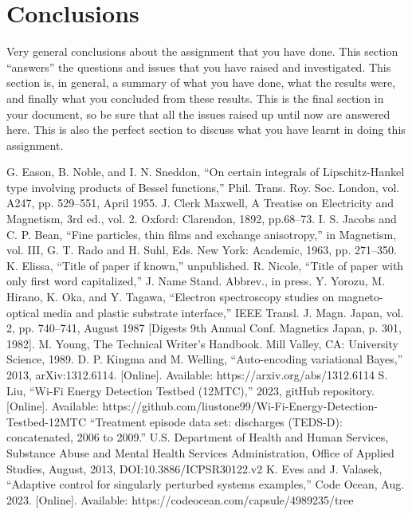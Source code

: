 \documentclass[conference]{IEEEtran}
\begin{document}
\section{Conclusions}
Very general conclusions about the assignment that you have done. This section “answers” the questions and issues that you have raised and investigated. This section is, in general, a summary of what you have done, what the results were, and finally what you concluded from these results. This is the final section in your document, so be sure that all the issues raised up until now are answered here. This is also the perfect section to discuss what you have learnt in doing this assignment.


\begin{thebibliography}{00}
 G. Eason, B. Noble, and I. N. Sneddon, ``On certain integrals of Lipschitz-Hankel type involving products of Bessel functions,'' Phil. Trans. Roy. Soc. London, vol. A247, pp. 529--551, April 1955.
 J. Clerk Maxwell, A Treatise on Electricity and Magnetism, 3rd ed., vol. 2. Oxford: Clarendon, 1892, pp.68--73.
 I. S. Jacobs and C. P. Bean, ``Fine particles, thin films and exchange anisotropy,'' in Magnetism, vol. III, G. T. Rado and H. Suhl, Eds. New York: Academic, 1963, pp. 271--350.
 K. Elissa, ``Title of paper if known,'' unpublished.
 R. Nicole, ``Title of paper with only first word capitalized,'' J. Name Stand. Abbrev., in press.
 Y. Yorozu, M. Hirano, K. Oka, and Y. Tagawa, ``Electron spectroscopy studies on magneto-optical media and plastic substrate interface,'' IEEE Transl. J. Magn. Japan, vol. 2, pp. 740--741, August 1987 [Digests 9th Annual Conf. Magnetics Japan, p. 301, 1982].
 M. Young, The Technical Writer's Handbook. Mill Valley, CA: University Science, 1989.
 D. P. Kingma and M. Welling, ``Auto-encoding variational Bayes,'' 2013, arXiv:1312.6114. [Online]. Available: https://arxiv.org/abs/1312.6114
 S. Liu, ``Wi-Fi Energy Detection Testbed (12MTC),'' 2023, gitHub repository. [Online]. Available: https://github.com/liustone99/Wi-Fi-Energy-Detection-Testbed-12MTC
 ``Treatment episode data set: discharges (TEDS-D): concatenated, 2006 to 2009.'' U.S. Department of Health and Human Services, Substance Abuse and Mental Health Services Administration, Office of Applied Studies, August, 2013, DOI:10.3886/ICPSR30122.v2
 K. Eves and J. Valasek, ``Adaptive control for singularly perturbed systems examples,'' Code Ocean, Aug. 2023. [Online]. Available: https://codeocean.com/capsule/4989235/tree
\end{thebibliography}
\end{document}

